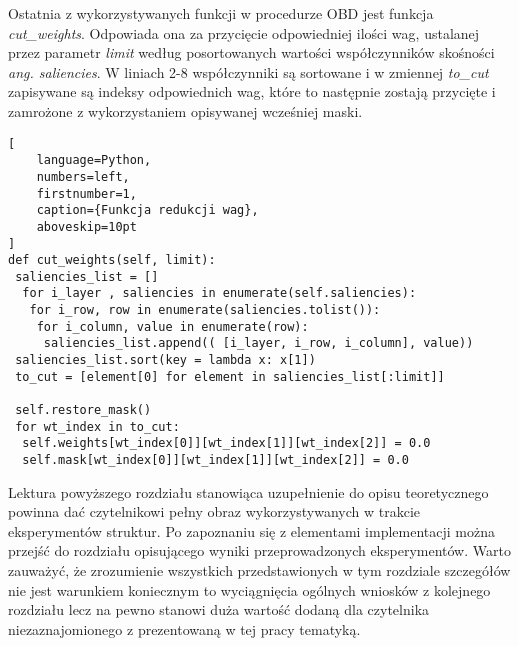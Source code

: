 \par Ostatnia z wykorzystywanych funkcji w procedurze OBD jest funkcja \emph{cut{\_}weights}. Odpowiada ona za przycięcie odpowiedniej ilości wag, ustalanej przez parametr \emph{limit} według posortowanych wartości współczynników skośności \emph{ang. saliencies}. W liniach 2-8 współczynniki są sortowane i w zmiennej \emph{to{\_}cut} zapisywane są indeksy odpowiednich wag, które to następnie zostają przycięte i zamrożone z wykorzystaniem opisywanej wcześniej maski.
\begin{addmargin}[10mm]{0mm}
\begin{lstlisting}[
    language=Python,
    numbers=left,
    firstnumber=1,
    caption={Funkcja redukcji wag},
    aboveskip=10pt
]
def cut_weights(self, limit):
 saliencies_list = []
  for i_layer , saliencies in enumerate(self.saliencies):
   for i_row, row in enumerate(saliencies.tolist()):
    for i_column, value in enumerate(row):
     saliencies_list.append(( [i_layer, i_row, i_column], value))                    
 saliencies_list.sort(key = lambda x: x[1])
 to_cut = [element[0] for element in saliencies_list[:limit]]
 
 self.restore_mask()
 for wt_index in to_cut:
  self.weights[wt_index[0]][wt_index[1]][wt_index[2]] = 0.0
  self.mask[wt_index[0]][wt_index[1]][wt_index[2]] = 0.0
\end{lstlisting}
\end{addmargin}

\vspace{10mm}
\par Lektura powyższego rozdziału stanowiąca uzupełnienie do opisu teoretycznego powinna dać czytelnikowi pełny obraz wykorzystywanych w trakcie eksperymentów struktur. Po zapoznaniu się z elementami implementacji można przejść do rozdziału opisującego wyniki przeprowadzonych eksperymentów. Warto zauważyć, że zrozumienie wszystkich przedstawionych w tym rozdziale szczegółów nie jest warunkiem koniecznym to wyciągnięcia ogólnych wniosków z kolejnego rozdziału lecz na pewno stanowi duża wartość dodaną dla czytelnika niezaznajomionego z prezentowaną w tej pracy tematyką.   